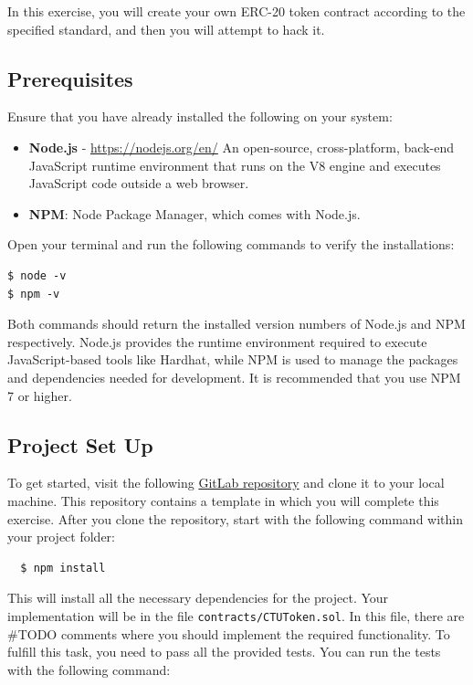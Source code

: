 \documentclass[12pt]{article}
\begin{document}
In this exercise, you will create your own ERC-20 token contract according to the specified standard, and then you will attempt to hack it.

\subsection*{Prerequisites}

Ensure that you have already installed the following on your system:

\begin{itemize}
    \item \textbf{Node.js} - \url{https://nodejs.org/en/}
    An open-source, cross-platform, back-end JavaScript runtime environment that runs on the V8 engine and executes JavaScript code outside a web browser. 
    \item \textbf{NPM}: Node Package Manager, which comes with Node.js.
\end{itemize}

Open your terminal and run the following commands to verify the installations:

\begin{verbatim}
$ node -v
$ npm -v
\end{verbatim}

Both commands should return the installed version numbers of Node.js and NPM respectively. Node.js provides the runtime environment required to execute JavaScript-based tools like Hardhat, while NPM is used to manage the packages and dependencies needed for development. It is recommended that you use NPM 7 or higher.

\subsection*{Project Set Up}

To get started, visit the following \href{https://gitlab.fel.cvut.cz/radovluk/smart-contracts-exercises/-/tree/main/03-ERC20-CTUToken/task/task-code}{GitLab repository} and clone it to your local machine. This repository contains a template in which you will complete this exercise. After you clone the repository, start with the following command within your project folder:

\begin{verbatim}
  $ npm install
\end{verbatim}
This will install all the necessary dependencies for the project. Your implementation will be in the file \texttt{contracts/CTUToken.sol}. In this file, there are \#TODO comments where you should implement the required functionality. To fulfill this task, you need to pass all the provided tests. You can run the tests with the following command:
\end{document}
